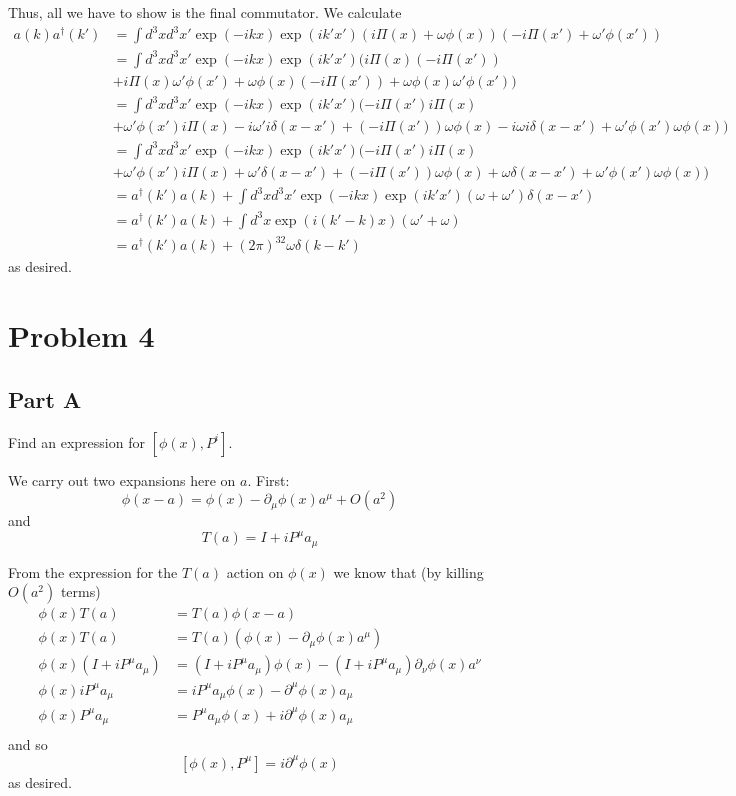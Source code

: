 \documentclass[fontsize=11pt]{scrartcl} %
\numberwithin{equation}{section} %
\numberwithin{figure}{section} %
\numberwithin{table}{section} %
\newcommand{\ad}{a^{\dagger}}
\begin{document}
Thus, all we have to show is the final commutator. We calculate
\[
\begin{aligned}
    a(k)\ad(k') &= \int d^3x d^3x' \exp(-ikx)\exp(ik'x')(i\Pi(x) +
    \omega\phi(x))(-i\Pi(x') + \omega'\phi(x'))\\
    &=\int d^3x d^3x' \exp(-ikx)\exp(ik'x')(i\Pi(x)(-i\Pi(x')) \\
        &+ i\Pi(x)\omega'\phi(x') + \omega\phi(x)(-i\Pi(x')) +
            \omega\phi(x)\omega'\phi(x'))\\
    &=\int d^3x d^3x' \exp(-ikx)\exp(ik'x')(-i\Pi(x')i\Pi(x) \\
        &+ \omega'\phi(x')i\Pi(x) - i\omega'i\delta(x-x') +
        (-i\Pi(x'))\omega\phi(x) - i\omega i\delta(x-x') +
            \omega'\phi(x')\omega\phi(x))\\
    &=\int d^3x d^3x' \exp(-ikx)\exp(ik'x')(-i\Pi(x')i\Pi(x) \\
    &+ \omega'\phi(x')i\Pi(x) + \omega'\delta(x-x') +
    (-i\Pi(x'))\omega\phi(x) + \omega\delta(x-x') +
        \omega'\phi(x')\omega\phi(x))\\
        &=\ad(k')a(k) + \int d^3x
        d^3x'\exp(-ikx)\exp(ik'x')(\omega+\omega')\delta(x-x')\\
        &=\ad(k')a(k) + \int d^3x \exp(i(k'-k)x)(\omega'+\omega)\\
        &=\ad(k')a(k) + (2\pi)^32\omega\delta(k-k')
\end{aligned}
\]
as desired.


\newpage
\section*{Problem 4}
\subsection*{Part A}
Find an expression for $[\phi(x),P^i]$.

We carry out two expansions here on $a$. First:
\[
    \phi(x-a) = \phi(x) - \partial_{\mu}\phi(x)a^{\mu} + O(a^2)
\]
and
\[
    T(a) = I + iP^{\mu}a_{\mu}
\]

From the expression for the $T(a)$ action on $\phi(x)$ we know that (by killing
$O(a^2)$ terms)
\[
    \begin{aligned}
        \phi(x)T(a) &= T(a)\phi(x-a)\\
        \phi(x)T(a) &= T(a)\left( \phi(x) -\partial_{\mu}\phi(x)a^{\mu}
        \right)\\
        \phi(x)(I + iP^{\mu}a_{\mu}) &= (I + iP^{\mu}a_{\mu})\phi(x) - (I +
        iP^{\mu}a_{\mu})\partial_{\nu}\phi(x)a^{\nu}\\
        \phi(x)iP^{\mu}a_{\mu} &=iP^{\mu}a_{\mu}\phi(x) -
        \partial^{\mu}\phi(x)a_{\mu}\\
        \phi(x)P^{\mu}a_{\mu} &= P^{\mu}a_{\mu}\phi(x) +
        i\partial^{\mu}\phi(x)a_{\mu}\\
    \end{aligned}
\]
and so
\[
    [\phi(x),P^{\mu}] = i\partial^{\mu}\phi(x)
\]
as desired.
\end{document}
